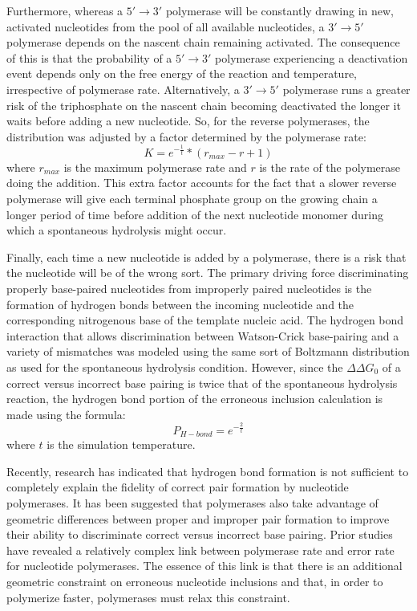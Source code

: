 Furthermore, whereas a $5'\to3'$ polymerase will be constantly drawing in new, activated nucleotides from the pool of all available nucleotides, a $3'\to5'$ polymerase depends on the nascent chain remaining activated. The consequence of this is that the probability of a $5'\to3'$ polymerase experiencing a deactivation event depends only on the free energy of the reaction and temperature, irrespective of polymerase rate. Alternatively, a $3'\to5'$ polymerase runs a greater risk of the triphosphate on the nascent chain becoming deactivated the longer it waits before adding a new nucleotide. So, for the reverse polymerases, the distribution was adjusted by a factor determined by the polymerase rate:\[
	K = e^{-\frac{1}{t}}*(r_{max} - r + 1)
\] where $r_{max}$ is the maximum polymerase rate and $r$ is the rate of the polymerase doing the addition. This extra factor accounts for the fact that a slower reverse polymerase will give each terminal phosphate group on the growing chain a longer period of time before addition of the next nucleotide monomer during which a spontaneous hydrolysis might occur.

Finally, each time a new nucleotide is added by a polymerase, there is a risk that the nucleotide will be of the wrong sort. The primary driving force discriminating properly base-paired nucleotides from improperly paired nucleotides is the formation of hydrogen bonds between the incoming nucleotide and the corresponding nitrogenous base of the template nucleic acid. The hydrogen bond interaction that allows discrimination between Watson-Crick base-pairing and a variety of mismatches was modeled using the same sort of Boltzmann distribution as used for the spontaneous hydrolysis condition. However, since the $\Delta\Delta G_0$ of a correct versus incorrect base pairing is twice that of the spontaneous hydrolysis reaction\cite{Petruska:1988p721,Bagshaw:1973p728}, the hydrogen bond portion of the erroneous inclusion calculation is made using the formula:\[
	P_{H-bond} = e^{-\frac{2}{t}}
\]
where $t$ is the simulation temperature.

Recently, research has indicated that hydrogen bond formation is not sufficient to completely explain the fidelity of correct pair formation by nucleotide polymerases. It has been suggested that polymerases also take advantage of geometric differences between proper and improper pair formation to improve their ability to discriminate correct versus incorrect base pairing. Prior studies have revealed a relatively complex link between polymerase rate and error rate for nucleotide polymerases\cite{Cady:2009p718}. The essence of this link is that there is an additional geometric constraint on erroneous nucleotide inclusions and that, in order to polymerize faster, polymerases must relax this constraint.

